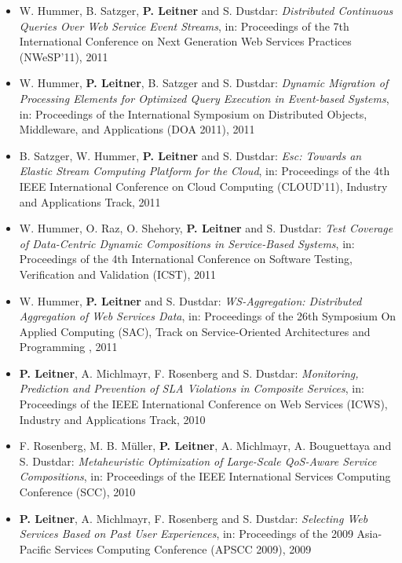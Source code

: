 \documentclass[paper=letter,fontsize=11pt]{scrartcl} %
\begin{document}
\begin{itemize}
\item W. Hummer, B. Satzger, \textbf{P. Leitner} and S. Dustdar:
\emph{Distributed Continuous Queries Over Web Service Event Streams}, in: Proceedings of the 7th International Conference on Next Generation Web Services Practices
(NWeSP'11), 2011
\item W. Hummer, \textbf{P. Leitner}, B. Satzger and S. Dustdar:
\emph{Dynamic Migration of Processing Elements for Optimized Query Execution in
Event-based Systems}, in: Proceedings of the International Symposium on Distributed
Objects, Middleware, and Applications (DOA 2011), 2011
\item B. Satzger, W. Hummer, \textbf{P. Leitner} and S. Dustdar:
\emph{Esc: Towards an Elastic Stream Computing Platform for the Cloud},
in: Proceedings of the 4th IEEE International Conference on Cloud Computing (CLOUD'11), Industry and Applications Track, 2011
\item W. Hummer, O. Raz, O. Shehory, \textbf{P. Leitner} and S. Dustdar:
\emph{Test Coverage of Data-Centric Dynamic Compositions in Service-Based
Systems}, in: Proceedings of the 4th International Conference on Software Testing,
Verification and Validation (ICST), 2011
\item W. Hummer, \textbf{P. Leitner} and S. Dustdar: \emph{WS-Aggregation: Distributed Aggregation of Web Services Data}, in: Proceedings of the 26th Symposium On Applied Computing (SAC), Track on Service-Oriented Architectures and Programming , 2011
\item \textbf{P. Leitner}, A. Michlmayr, F. Rosenberg and S. Dustdar: \emph{Monitoring, Prediction and Prevention of SLA Violations in Composite Services}, in: Proceedings of the IEEE International Conference on Web Services (ICWS), Industry and Applications Track, 2010
\item F. Rosenberg, M. B. M\"uller, \textbf{P. Leitner}, A. Michlmayr, A. Bouguettaya
and S. Dustdar: \emph{Metaheuristic Optimization of Large-Scale QoS-Aware Service Compositions}, in: Proceedings of the IEEE International Services Computing Conference (SCC), 2010
\item \textbf{P. Leitner}, A. Michlmayr, F. Rosenberg and S. Dustdar: \emph{Selecting Web Services Based on Past User Experiences}, in: Proceedings of the 2009 Asia-Pacific Services Computing Conference (APSCC 2009), 2009

\end{itemize}
\end{document}
